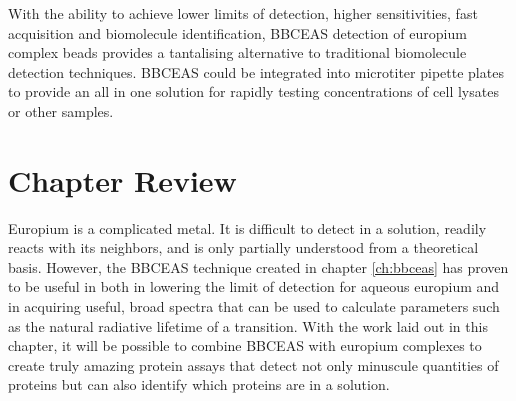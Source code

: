 With the ability to achieve lower limits of detection, higher sensitivities,
fast acquisition and biomolecule identification, \ac{BBCEAS} detection of
europium complex beads provides a tantalising alternative to traditional
biomolecule detection techniques. \ac{BBCEAS} could be integrated into
microtiter pipette plates to provide an all in one solution for rapidly
testing concentrations of cell lysates or other samples.



\section*{Chapter Review}

Europium is a complicated metal. It is difficult to detect in a solution,
readily reacts with its neighbors, and is only partially understood from a
theoretical basis. However, the \ac{BBCEAS} technique created in chapter
\ref{ch:bbceas} has proven to be useful in both in lowering the limit of
detection for aqueous europium and in acquiring useful, broad spectra that
can be used to calculate parameters such as the natural radiative lifetime of
a transition. With the work laid out in this chapter, it will be possible to
combine \ac{BBCEAS} with europium complexes to create truly amazing protein
assays that detect not only minuscule quantities of proteins but can also
identify which proteins are in a solution.
